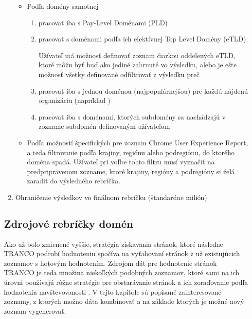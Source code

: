 \begin{enumerate}
\begin{itemize}
        \item Podľa domény samotnej
        \begin{enumerate}
            \item pracovať iba s Pay-Level Doménami (PLD)
            \item pracovať s doménami podľa ich efektívnej Top Level Domény (eTLD):
            
            Užívateľ má možnosť definovať zoznam čiarkou oddelených eTLD, ktoré môžu byť buď ako jediné zahrnuté vo
            výsledku, alebo je ešte možnosť všetky definované odfiltrovať z výsledku preč
            
            \item pracovať iba s jednou doménou (najpopulárnejšou) pre každú nájdenú organizáciu (napríklad )
            \item pracovať iba s doménami, ktorých subdomény sa nachádzajú v zozname subdomén definovaným užívateľom 
        \end{enumerate}

        \item Podľa možností špecifických pre zoznam Chrome User Experience Report, a teda filtrovanie podľa krajiny, regiónu alebo podregiónu, do ktorého doména spadá. Užívateľ pri voľbe tohto filtru musí vyznačiť na predpripravenom zozname, ktoré krajiny, regióny a podregióny si želá zaradiť do výsledného rebríčka.
    \end{itemize}

    \item Ohraničenie výsledkov vo finálnom rebríčku (štandardne milión)
    
\end{enumerate}


\subsection{Zdrojové rebríčky domén}
\label{tranco-source-rankings}

Ako už bolo zmienené vyššie, stratégia získavania stránok, ktoré následne TRANCO podrobí hodnoteniu spočíva na vyťahovaní stránok z už existujúcich zoznamov s hotovým hodnotením. 
Zdrojom dát pre hodnotenie stránok TRANCO je teda množina niekoľkých podobných zoznamov, ktoré sami na ich úrovni používajú rôžne stratégie pre obstarávanie stránok a ich zoraďovanie 
podľa hodnotenia navštevovanosti \cite{tranco-methodology}. V tejto kapitole sú popísané zainteresované zoznamy, z ktorých možno dáta kombinovať 
a na základe ktorých je možné nový zoznam vygenerovať.

